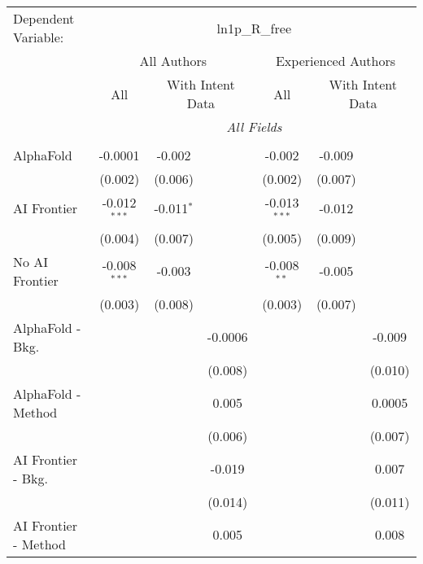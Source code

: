 \begingroup
\centering
\begin{tabular}{lcccccc}
   \tabularnewline \midrule \midrule
   Dependent Variable: & \multicolumn{6}{c}{ln1p\_R\_free}\\
 & \multicolumn{3}{c}{All Authors} & \multicolumn{3}{c}{Experienced Authors} \\
\cmidrule(lr){2-4} \cmidrule(lr){5-7}
 & \multicolumn{1}{c}{All} & \multicolumn{2}{c}{With Intent Data} & \multicolumn{1}{c}{All} & \multicolumn{2}{c}{With Intent Data} \\
\cmidrule(lr){2-2} \cmidrule(lr){3-4} \cmidrule(lr){5-5} \cmidrule(lr){6-7}
 & \multicolumn{6}{c}{\textit{All Fields}} \\ \\
   AlphaFold               & -0.0001        & -0.002       &         & -0.002         & -0.009  &   \\   
                           & (0.002)        & (0.006)      &         & (0.002)        & (0.007) &   \\   
   AI Frontier             & -0.012$^{***}$ & -0.011$^{*}$ &         & -0.013$^{***}$ & -0.012  &   \\   
                           & (0.004)        & (0.007)      &         & (0.005)        & (0.009) &   \\   
   No AI Frontier          & -0.008$^{***}$ & -0.003       &         & -0.008$^{**}$  & -0.005  &   \\   
                           & (0.003)        & (0.008)      &         & (0.003)        & (0.007) &   \\   
   AlphaFold - Bkg.        &                &              & -0.0006 &                &         & -0.009\\   
                           &                &              & (0.008) &                &         & (0.010)\\   
   AlphaFold - Method      &                &              & 0.005   &                &         & 0.0005\\   
                           &                &              & (0.006) &                &         & (0.007)\\   
   AI Frontier - Bkg.      &                &              & -0.019  &                &         & 0.007\\   
                           &                &              & (0.014) &                &         & (0.011)\\   
   AI Frontier - Method    &                &              & 0.005   &                &         & 0.008\\   

\end{tabular}
